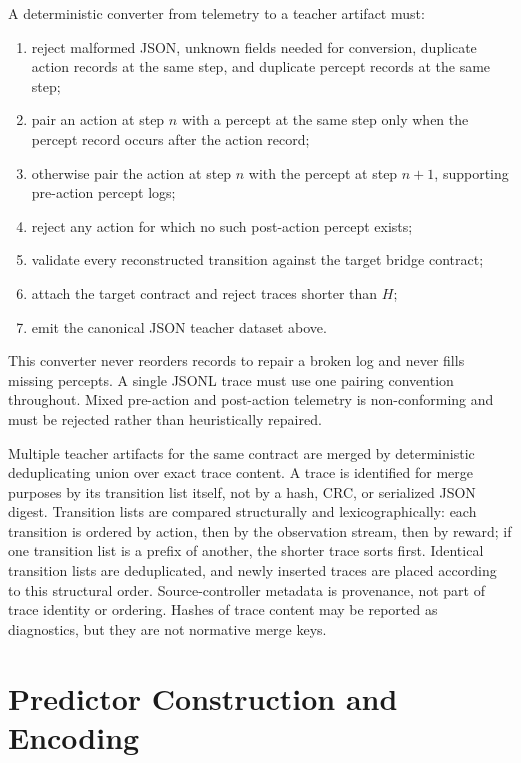 \documentclass[11pt]{article}
\begin{document}
A deterministic converter from telemetry to a teacher artifact must:
\begin{enumerate}
    \item reject malformed JSON, unknown fields needed for conversion,
    duplicate action records at the same step, and duplicate percept records
    at the same step;
    \item pair an action at step \(n\) with a percept at the same step only
    when the percept record occurs after the action record;
    \item otherwise pair the action at step \(n\) with the percept at
    step \(n+1\), supporting pre-action percept logs;
    \item reject any action for which no such post-action percept exists;
    \item validate every reconstructed transition against the target bridge
    contract;
    \item attach the target contract and reject traces shorter than \(H\);
    \item emit the canonical JSON teacher dataset above.
\end{enumerate}
This converter never reorders records to repair a broken log and never fills
missing percepts. A single JSONL trace must use one pairing convention
throughout. Mixed pre-action and post-action telemetry is non-conforming and
must be rejected rather than heuristically repaired.

Multiple teacher artifacts for the same contract are merged by deterministic
deduplicating union over exact trace content. A trace is identified for merge
purposes by its transition list itself, not by a hash, CRC, or serialized JSON
digest. Transition lists are compared structurally and lexicographically: each
transition is ordered by action, then by the observation stream, then by reward;
if one transition list is a prefix of another, the shorter trace sorts first.
Identical transition lists are deduplicated, and newly inserted traces are
placed according to this structural order. Source-controller metadata is
provenance, not part of trace identity or ordering. Hashes of trace content may
be reported as diagnostics, but they are not normative merge keys.

\section{Predictor Construction and Encoding}
\label{sec:predictor}
\end{document}
